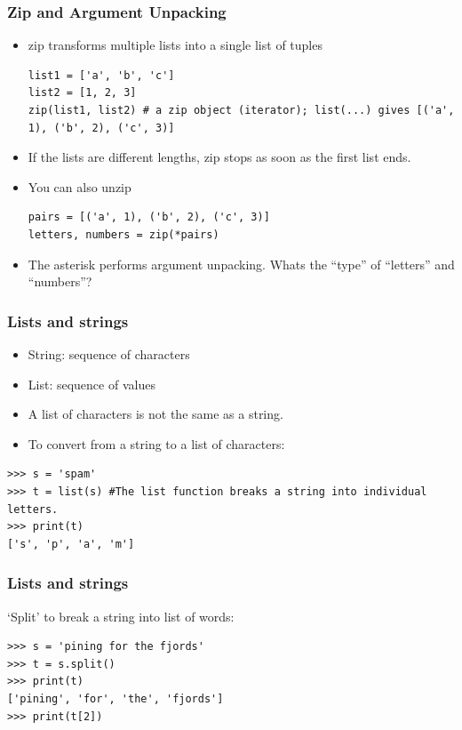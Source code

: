 \begin{frame}[fragile]\frametitle{Zip and Argument Unpacking}
  \begin{itemize}
  \item zip transforms multiple lists into a single list of tuples
  \begin{lstlisting}
list1 = ['a', 'b', 'c']
list2 = [1, 2, 3]
zip(list1, list2) # a zip object (iterator); list(...) gives [('a', 1), ('b', 2), ('c', 3)]
  \end{lstlisting}
\item 	If the	lists are different lengths, zip stops as soon as the first list ends.
\item You can also unzip
  \begin{lstlisting}
pairs = [('a', 1), ('b', 2), ('c', 3)]
letters, numbers = zip(*pairs)
  \end{lstlisting}
\item The asterisk performs argument unpacking. Whats the ``type'' of ``letters'' and ``numbers''?
  \end{itemize}
\end{frame}

\begin{frame}[fragile]\frametitle{Lists and strings}
  \begin{itemize}
  \item String: sequence of characters
  \item List: sequence of values
  \item A list of characters is not the same as a string. 
  \item To convert from a string to a list of characters:
  \end{itemize}
    \begin{lstlisting}
>>> s = 'spam'
>>> t = list(s) #The list function breaks a string into individual letters.
>>> print(t)
['s', 'p', 'a', 'm']
  \end{lstlisting}
\end{frame}

\begin{frame}[fragile]\frametitle{Lists and strings}
  `Split' to break a string into list of words:
     \begin{lstlisting}
>>> s = 'pining for the fjords'
>>> t = s.split()
>>> print(t)
['pining', 'for', 'the', 'fjords']
>>> print(t[2])
  \end{lstlisting}
\end{frame}



